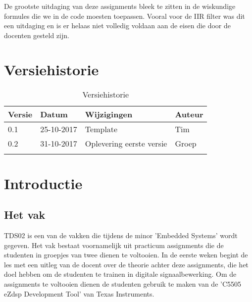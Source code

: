 \documentclass[11pt,a4paper]{article}
\begin{document}
De grootste uitdaging van deze assignments bleek te zitten in de wiskundige formules die we in de code moesten toepassen. Vooral voor de IIR filter was dit een uitdaging en is er helaas niet volledig voldaan aan de eisen die door de docenten gesteld zijn. 
	
	
		
	
	\clearpage
	
	\tableofcontents
	
	\clearpage
	
	\listoffigures
	
	\clearpage
	\listoftables
	
	\clearpage
	
	\section{Versiehistorie}
	\begin{table}[H]
		\centering
		\label{Versiehistorie}
		\begin{tabular}{|p{1cm}|p{2cm}|p{6cm}|p{2cm}|}
			\hline
			\rowcolor[HTML]{FFCC67}
			\textbf{Versie} & \textbf{Datum} & \textbf{Wijzigingen} & \textbf{Auteur} \\ \hline
			0.1    & 25-10-2017 & Template    & Tim \\ \hline
			0.2	   & 31-10-2017 & Oplevering eerste versie  & Groep \\ \hline
			&       &             &        \\ \hline
		\end{tabular}
		\caption {Versiehistorie} \label{tab:title} 
	\end{table}	


	\section{Introductie}
		\subsection{Het vak}
		TDS02 is een van de vakken die tijdens de minor 'Embedded Systems' wordt gegeven. Het vak bestaat voornamelijk uit practicum assignments die de studenten in groepjes van twee dienen te voltooien. In de eerste weken begint de les met een uitleg van de docent over de theorie achter deze assignments, die het doel hebben om de studenten te trainen in digitale signaalbewerking. Om de assignments te voltooien dienen de studenten gebruik te maken van de 'C5505 eZdsp Development Tool' van Texas Instruments.
		
\end{document}
